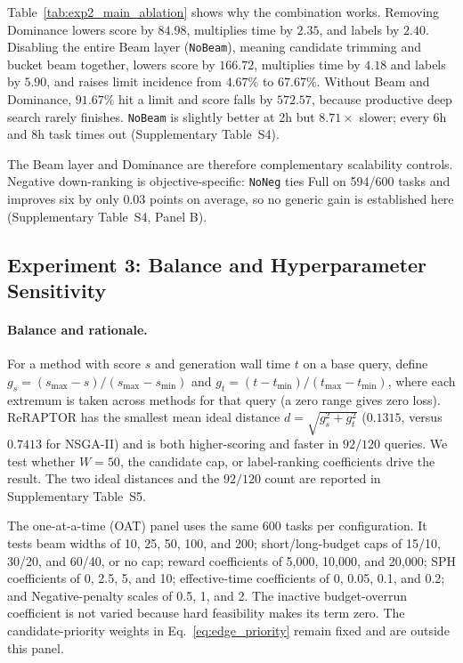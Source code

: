 Table~\ref{tab:exp2_main_ablation} shows why the combination works. Removing
Dominance lowers score by \(84.98\), multiplies time by \(2.35\), and labels by
\(2.40\). Disabling the entire Beam layer (\texttt{NoBeam}), meaning candidate
trimming and bucket beam together, lowers score by \(166.72\), multiplies time
by \(4.18\) and labels by \(5.90\), and raises limit incidence from \(4.67\%\)
to \(67.67\%\). Without Beam and Dominance, \(91.67\%\) hit a limit and score
falls by \(572.57\), because productive deep search rarely finishes.
\texttt{NoBeam} is slightly better at 2h but \(8.71\times\) slower; every 6h
and 8h task times out (Supplementary Table~S4).

The Beam layer and Dominance are therefore complementary scalability controls.
Negative down-ranking is objective-specific: \texttt{NoNeg} ties Full on
594/600 tasks and improves six by only \(0.03\) points on average, so no generic
gain is established here (Supplementary Table~S4, Panel B).

\subsection{Experiment 3: Balance and Hyperparameter Sensitivity}
\paragraph{Balance and rationale.}
For a method with score \(s\) and generation wall time \(t\) on a base query, define
\(g_s=(s_{\max}-s)/(s_{\max}-s_{\min})\) and
\(g_t=(t-t_{\min})/(t_{\max}-t_{\min})\), where each extremum is taken across
methods for that query (a zero range gives zero loss). ReRAPTOR has the smallest
mean ideal distance \(d=\sqrt{g_s^2+g_t^2}\) (\(0.1315\), versus \(0.7413\) for
NSGA-II) and is both higher-scoring and faster in \(92/120\) queries. We test
whether \(W=50\), the candidate cap, or label-ranking coefficients drive the
result. The two ideal distances and the \(92/120\) count are reported in
Supplementary Table~S5.

The one-at-a-time (OAT) panel uses the same 600 tasks per configuration. It tests
beam widths of 10, 25, 50, 100, and 200; short/long-budget caps of 15/10,
30/20, and 60/40, or no cap; reward coefficients of 5,000, 10,000, and
20,000; SPH coefficients of 0, 2.5, 5, and 10; effective-time coefficients of
0, 0.05, 0.1, and 0.2; and Negative-penalty scales of 0.5, 1, and 2.
The inactive budget-overrun coefficient is not varied because hard feasibility
makes its term zero. The candidate-priority weights in
Eq.~\ref{eq:edge_priority} remain fixed and are outside this panel.

